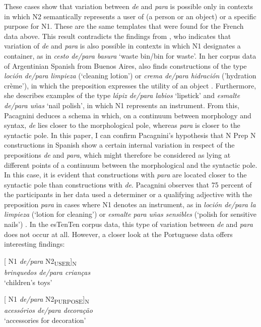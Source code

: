 \documentclass[output=paper]{langsci/langscibook}
\begin{document}
These cases show that variation between \textit{de} and \textit{para} is possible only in contexts in which N2 semantically represents a user of (a person or an object) or a specific purpose for N1. These are the same templates that were found for the French data above. This result contradicts the findings from \citet{Lopez:1970}, who indicates that variation of \textit{de} and \textit{para} is also possible in contexts in which N1 designates a container, as in \textit{cesto de/para basura} `waste bin/bin for waste'. In her corpus data of Argentinian Spanish from Buenos Aires, \citet{Pacagnini:2003} also finds constructions of the type \textit{loción de/para limpieza} (`cleaning lotion') or \textit{crema de/para hidración} ('hydration crème'), in which the preposition expresses the utility of an object \citep[164]{Pacagnini:2003}. Furthermore, she describes examples of the type \textit{lápiz de/para labios} `lipstick' and \textit{esmalte de/para uñas} `nail polish', in which N1 represents an instrument. From this, Pacagnini deduces a schema in which, on a continuum between morphology and syntax, \textit{de} lies closer to the morphological pole, whereas \textit{para} is closer to the syntactic pole. In this paper, I can confirm Pacagnini’s hypothesis that N Prep N constructions in Spanish show a certain internal variation in respect of the prepositions \textit{de} and \textit{para}, which might therefore be considered as lying at different points of a continuum between the morphological and the syntactic pole. In this case, it is evident that constructions with \textit{para} are located closer to the syntactic pole than constructions with \textit{de}. Pacagnini observes that 75 percent of the participants in her data used a determiner or a qualifying adjective with the preposition \textit{para} in cases where N1 denotes an instrument, as in \textit{loción de/para la limpieza} (`lotion for cleaning') or \textit{esmalte para uñas sensibles} (`polish for sensitive nails') \citep[166]{Pacagnini:2003}. In the esTenTen corpus data, this type of variation between \textit{de} and \textit{para} does not occur at all. However, a closer look at the Portuguese data offers interesting findings: \\ 

\begin{exe}\ex\begin{minipage}[t]{0.4\textwidth}    %
[ N1 \textit{de/para} N2\textsubscript{USER}]\textsubscript{N}\\
\textit{brinquedos de/para crianças}\\
`children’s toys'
\end{minipage}\hfill%
\begin{minipage}[t]{0.45\textwidth}
[ N1 \textit{de/para} N2\textsubscript{PURPOSE}]\textsubscript{N}\\
\textit{acessórios de/para decoração}\\
`accessories for decoration'
\end{minipage}
\end{exe}
\end{document}
